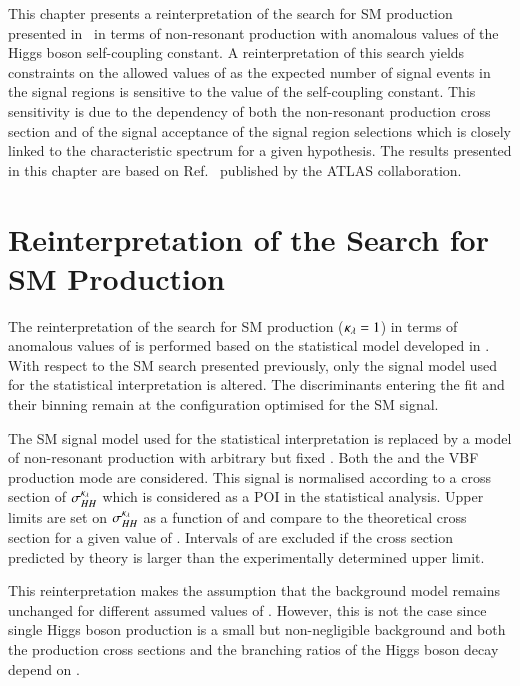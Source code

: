 This chapter presents a reinterpretation of the search for SM \HH
production presented in~ in terms of non-resonant
\HH production with anomalous values of the Higgs boson self-coupling
constant. A reinterpretation of this search yields constraints on the
allowed values of \klambda as the expected number of signal events in
the signal regions is sensitive to the value of the self-coupling
constant. This sensitivity is due to the \klambda dependency of both
the non-resonant \HH production cross section and of the signal
acceptance of the signal region selections which is closely linked to
the characteristic \mHH spectrum for a given \klambda hypothesis. The
results presented in this chapter are based on
Ref.~\cite{ATLAS-CONF-2021-052} published by the ATLAS collaboration.


\section{Reinterpretation of the Search for SM \HH Production}%
\label{sec:reinterpretation}

The reinterpretation of the search for SM \HH production
($\kappa_{\lambda} = 1$) in terms of anomalous values of \klambda is performed
based on the statistical model developed in
. With respect to the SM \HH search
presented previously, only the signal model used for the statistical
interpretation is altered. The discriminants entering the fit and
their binning remain at the configuration optimised for the SM \HH
signal.

The SM \HH signal model used for the statistical interpretation is
replaced by a model of non-resonant \HH production with arbitrary but
fixed \klambda. Both the \ggF and the VBF production mode are
considered. This signal is normalised according to a cross section of
$\sigma_{HH}^{\kappa_{\lambda}}$ which is considered as a POI in the
statistical analysis. Upper limits are set on $\sigma_{HH}^{\kappa_{\lambda}}$
as a function of \klambda and compare to the theoretical cross section
for a given value of \klambda. Intervals of \klambda are excluded if
the cross section predicted by theory is larger than the
experimentally determined upper limit.

This reinterpretation makes the assumption that the background model
remains unchanged for different assumed values of \klambda. However,
this is not the case since single Higgs boson production is a small
but non-negligible background and both the production cross sections
and the branching ratios of the Higgs boson decay depend on \klambda.

